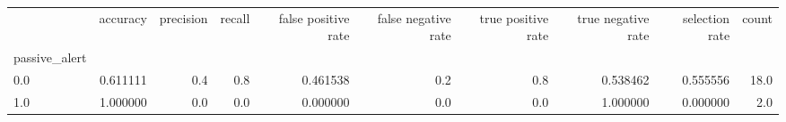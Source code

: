 \begin{tabular}{lrrrrrrrrr}
\toprule
{} &  accuracy &  precision &  recall &  false positive rate &  false negative rate &  true positive rate &  true negative rate &  selection rate &  count \\
passive\_alert &           &            &         &                      &                      &                     &                     &                 &        \\
\midrule
0.0           &  0.611111 &        0.4 &     0.8 &             0.461538 &                  0.2 &                 0.8 &            0.538462 &        0.555556 &   18.0 \\
1.0           &  1.000000 &        0.0 &     0.0 &             0.000000 &                  0.0 &                 0.0 &            1.000000 &        0.000000 &    2.0 \\
\bottomrule
\end{tabular}
